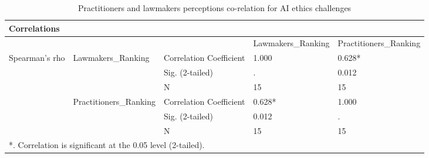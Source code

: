 \begin{table}[]
\centering
\caption{Practitioners and lawmakers perceptions co-relation for AI ethics challenges}
\label{tab:corr_challenges}
\begin{tabular}{|lllll|}
\hline
\multicolumn{5}{|l|}{Correlations} \\ \hline
\multicolumn{3}{|l|}{} & \multicolumn{1}{l|}{Lawmakers\_Ranking} & Practitioners\_Ranking \\ \hline
\multicolumn{1}{|l|}{\multirow{6}{*}{Spearman's rho}} & \multicolumn{1}{l|}{\multirow{3}{*}{Lawmakers\_Ranking}} & \multicolumn{1}{l|}{Correlation Coefficient} & \multicolumn{1}{l|}{1.000} & 0.628* \\ \cline{3-5} 
\multicolumn{1}{|l|}{} & \multicolumn{1}{l|}{} & \multicolumn{1}{l|}{Sig. (2-tailed)} & \multicolumn{1}{l|}{.} & 0.012 \\ \cline{3-5} 
\multicolumn{1}{|l|}{} & \multicolumn{1}{l|}{} & \multicolumn{1}{l|}{N} & \multicolumn{1}{l|}{15} & 15 \\ \cline{2-5} 
\multicolumn{1}{|l|}{} & \multicolumn{1}{l|}{\multirow{3}{*}{Practitioners\_Ranking}} & \multicolumn{1}{l|}{Correlation Coefficient} & \multicolumn{1}{l|}{0.628*} & 1.000 \\ \cline{3-5} 
\multicolumn{1}{|l|}{} & \multicolumn{1}{l|}{} & \multicolumn{1}{l|}{Sig. (2-tailed)} & \multicolumn{1}{l|}{0.012} & . \\ \cline{3-5} 
\multicolumn{1}{|l|}{} & \multicolumn{1}{l|}{} & \multicolumn{1}{l|}{N} & \multicolumn{1}{l|}{15} & 15 \\ \hline
\multicolumn{5}{|l|}{*.   Correlation is significant at the 0.05 level (2-tailed).} \\ \hline
\end{tabular}%
\end{table}

